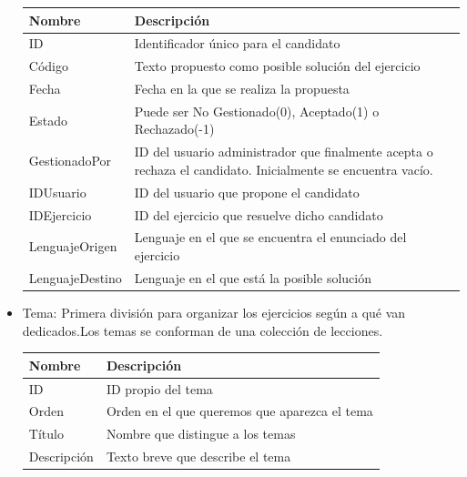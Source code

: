 \begin{itemize}
\begin{tabularx}{15cm}{|l|X|}
\hline
\textbf{Nombre} & \textbf{Descripción}                                                              \\ \hline
ID              & Identificador único para el candidato                                         \\ \hline
Código        & Texto propuesto como posible solución del ejercicio \\ \hline
Fecha      & Fecha en la que se realiza la propuesta \\ \hline
Estado              & Puede ser No Gestionado(0), Aceptado(1) o Rechazado(-1)                                         \\ \hline
GestionadoPor        & ID del usuario administrador que finalmente acepta o rechaza el candidato. Inicialmente se encuentra vacío. \\ \hline
IDUsuario      & ID del usuario que propone el candidato \\ \hline
IDEjercicio              & ID del ejercicio que resuelve dicho candidato                                         \\ \hline
LenguajeOrigen        & Lenguaje en el que se encuentra el enunciado del ejercicio \\ \hline
LenguajeDestino      & Lenguaje en el que está la posible solución \\ \hline
\end{tabularx}
\vspace{1em}

\item Tema: Primera división para organizar los ejercicios según a qué van dedicados.Los temas se conforman de una colección de lecciones.

\begin{tabularx}{15cm}{|l|X|}
\hline
\textbf{Nombre} & \textbf{Descripción}                                                              \\ \hline
ID       & ID propio del tema                                                           \\ \hline
Orden     & Orden en el que queremos que aparezca el tema                                           \\ \hline
Título            & Nombre que distingue a los temas \\ \hline
Descripción            & Texto breve que describe el tema \\ \hline
\end{tabularx}
\vspace{1em}


\end{itemize}
